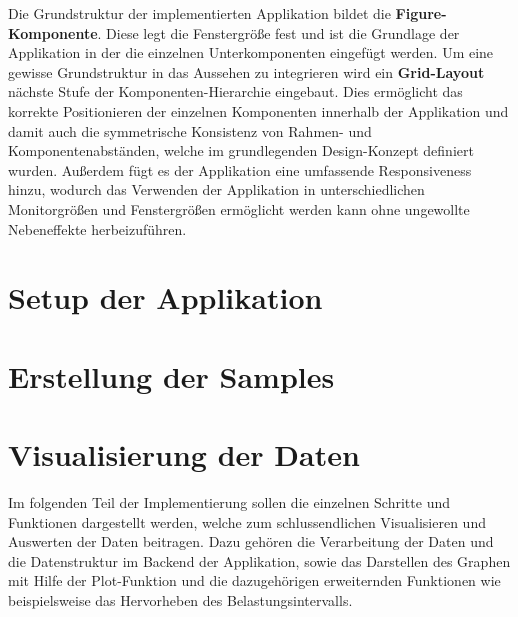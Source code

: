 

Die Grundstruktur der implementierten Applikation bildet die \textbf{Figure-Komponente}. Diese legt die Fenstergröße fest und ist die Grundlage der Applikation in der die einzelnen Unterkomponenten eingefügt werden. Um eine gewisse Grundstruktur in das Aussehen zu integrieren wird ein \textbf{Grid-Layout} nächste Stufe der Komponenten-Hierarchie eingebaut. Dies ermöglicht das korrekte Positionieren der einzelnen Komponenten innerhalb der Applikation und damit auch die symmetrische Konsistenz von Rahmen- und Komponentenabständen, welche im grundlegenden Design-Konzept definiert wurden. Außerdem fügt es der Applikation eine umfassende Responsiveness hinzu, wodurch das Verwenden der Applikation in unterschiedlichen Monitorgrößen und Fenstergrößen ermöglicht werden kann ohne ungewollte Nebeneffekte herbeizuführen.




\section{Setup der Applikation}


\section{Erstellung der Samples}


\section{Visualisierung der Daten}

Im folgenden Teil der Implementierung sollen die einzelnen Schritte und Funktionen dargestellt werden, welche zum schlussendlichen Visualisieren und Auswerten der Daten beitragen. Dazu gehören die Verarbeitung der Daten und die Datenstruktur im Backend der Applikation, sowie das Darstellen des Graphen mit Hilfe der Plot-Funktion und die dazugehörigen erweiternden Funktionen wie beispielsweise das Hervorheben des Belastungsintervalls.

